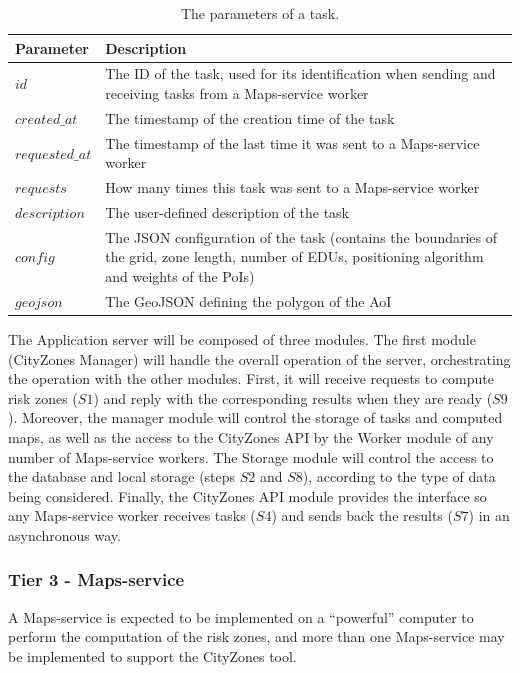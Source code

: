 \begin{refsection}
\begin{table}[h]
  \centering
  \begin{tabular}{p{.2\linewidth}p{.7\linewidth}}
    \hline
    \textbf{Parameter} & \textbf{Description} \\
    \hline
    $id$            & The ID of the task, used for its identification when sending and receiving tasks from a Maps-service worker \\
    $created\_at$   & The timestamp of the creation time of the task \\
    $requested\_at$ & The timestamp of the last time it was sent to a Maps-service worker \\
    $requests$      & How many times this task was sent to a Maps-service worker \\
    $description$   & The user-defined description of the task \\
    $config$        & The JSON configuration of the task (contains the boundaries of the grid, zone length, number of EDUs, positioning algorithm and weights of the PoIs) \\
    $geojson$       & The GeoJSON defining the polygon of the AoI \\
    \hline
  \end{tabular}
  \caption{The parameters of a task.}\label{tab:task}
\end{table}

The Application server will be composed of three modules. The first module (CityZones Manager) will handle the overall operation of the server, orchestrating the operation with the other modules. First, it will receive requests to compute risk zones ($S1$) and reply with the corresponding results when they are ready ($S9$). Moreover, the manager module will control the storage of tasks and computed maps, as well as the access to the CityZones API by the Worker module of any number of Maps-service workers. The Storage module will control the access to the database and local storage (steps $S2$ and $S8$), according to the type of data being considered. Finally, the CityZones API module provides the interface so any Maps-service worker receives tasks ($S4$) and sends back the results ($S7$) in an asynchronous way.

\subsubsection{Tier 3 - Maps-service}

A Maps-service is expected to be implemented on a ``powerful'' computer to perform the computation of the risk zones, and more than one Maps-service may be implemented to support the CityZones tool.


\end{refsection}
